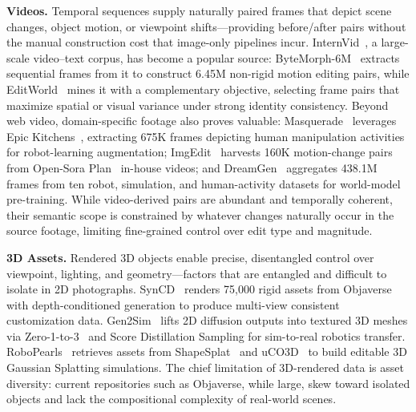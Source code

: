 \textbf{Videos.}
Temporal sequences supply naturally paired frames that depict scene changes, object motion, or viewpoint shifts---providing before/after pairs without the manual construction cost that image-only pipelines incur. InternVid~\citep{wang2023internvid}, a large-scale video--text corpus, has become a popular source: ByteMorph-6M~\citep{chang2025bytemorph} extracts sequential frames from it to construct 6.45M non-rigid motion editing pairs, while EditWorld~\citep{zeng2025editworld} mines it with a complementary objective, selecting frame pairs that maximize spatial or visual variance under strong identity consistency. Beyond web video, domain-specific footage also proves valuable: Masquerade~\citep{lepert2025masquerade} leverages Epic Kitchens~\citep{damen2018scaling}, extracting 675K frames depicting human manipulation activities for robot-learning augmentation; ImgEdit~\citep{ye2025imgedit} harvests 160K motion-change pairs from Open-Sora Plan~\citep{zheng2024open} in-house videos; and DreamGen~\citep{jang2025dreamgen} aggregates 438.1M frames from ten robot, simulation, and human-activity datasets for world-model pre-training. While video-derived pairs are abundant and temporally coherent, their semantic scope is constrained by whatever changes naturally occur in the source footage, limiting fine-grained control over edit type and magnitude.

\textbf{3D Assets.}
Rendered 3D objects enable precise, disentangled control over viewpoint, lighting, and geometry---factors that are entangled and difficult to isolate in 2D photographs. SynCD~\citep{kumari2025generating} renders 75,000 rigid assets from Objaverse~\citep{deitke2023objaverse} with depth-conditioned generation to produce multi-view consistent customization data. Gen2Sim~\citep{katara2024gen2sim} lifts 2D diffusion outputs into textured 3D meshes via Zero-1-to-3~\citep{liu2023zero} and Score Distillation Sampling for sim-to-real robotics transfer. RoboPearls~\citep{tao2025robopearls} retrieves assets from ShapeSplat~\citep{ma2024shapesplat} and uCO3D~\citep{liu24uco3d} to build editable 3D Gaussian Splatting simulations. The chief limitation of 3D-rendered data is asset diversity: current repositories such as Objaverse, while large, skew toward isolated objects and lack the compositional complexity of real-world scenes.

